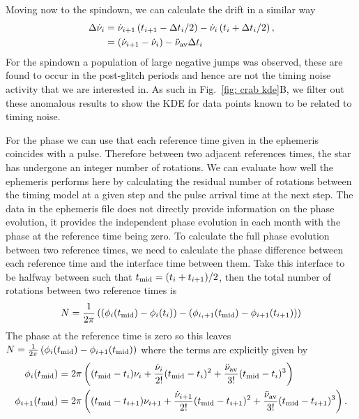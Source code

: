 \documentclass[../full_thesis/full_thesis.tex]{subfiles}
\begin{document}
\begin{subappendices}
Moving now to the spindown, we can calculate the drift in a similar way
\begin{align}
\Delta\dot{\nu}_{i} & = \dot{\nu}_{i+1}\left(t_{i+1}-\Delta t_{i}/2\right) -  \dot{\nu}_{i}\left(t_{i}+\Delta t_{i}/2\right), \\
& = \left(\dot{\nu}_{i+1}-\dot{\nu}_{i}\right) -  \ddot{\nu}_{\textrm{av}} \Delta t_{i}
\label{eqn: crab spindown residuals}
\end{align}
For the spindown a population of large negative jumps was observed, these are
found to occur in the post-glitch periods and hence are not the timing noise
activity that we are interested in. As such in Fig.~\ref{fig: crab kde}B, we
filter out these anomalous results to show the KDE for data points known to be
related to timing noise.

For the phase we can use that each reference time given in the ephemeris
coincides with a pulse. Therefore between two adjacent references times, the
star has undergone an integer number of rotations. We can evaluate how well the
ephemeris performs here by calculating the residual number of rotations between
the timing model at a given step and the pulse arrival time at the next step.
The data in the ephemeris file does not directly provide information on the
phase evolution, it provides the independent phase evolution in each month with
the phase at the reference time being zero. To calculate the full phase
evolution between two reference times, we need to calculate the phase
difference between each reference time and the interface time between them.
Take this interface to be halfway between such that $t_{\textrm{mid}}=(t_{i} +
t_{i+1})/2$, then the total number of rotations between two reference times is
\begin{equation}
    N = \frac{1}{2\pi}\left(\left(\phi_{i}(t_{\textrm{mid}}) - \phi_{i}(t_{i})\right) -
    \left(\phi_{i_i+1}(t_{\textrm{mid}}) - \phi_{i+1}(t_{i+1})\right)\right)
\end{equation}
The phase at the reference time is zero so this leaves $N =
\frac{1}{2\pi}\left(\phi_{i}(t_{\textrm{mid}}) - \phi_{i+1}(t_{\textrm{mid}})\right)$ where the terms
are explicitly given by
\begin{align}
\phi_{i}(t_{\textrm{mid}}) & = 2\pi\left((t_{\textrm{mid}} - t_{i})\nu_{i} +  \frac{\dot{\nu}_{i}}{2!}(t_{\textrm{mid}} - t_{i})^{2}+\frac{\ddot{\nu}_{\textrm{av}}}{3!}(t_{\textrm{mid}} - t_{i})^{3}\right) \\
\phi_{i+1}(t_{\textrm{mid}}) & = 2\pi\left((t_{\textrm{mid}} - t_{i+1})\nu_{i+1} +  \frac{\dot{\nu}_{i+1}}{2!}(t_{\textrm{mid}} - t_{i+1})^{2}+\frac{\ddot{\nu}_{\textrm{av}}}{3!}(t_{\textrm{mid}} - t_{i+1})^{3}\right) .
\end{align}


\end{subappendices}
\end{document}
